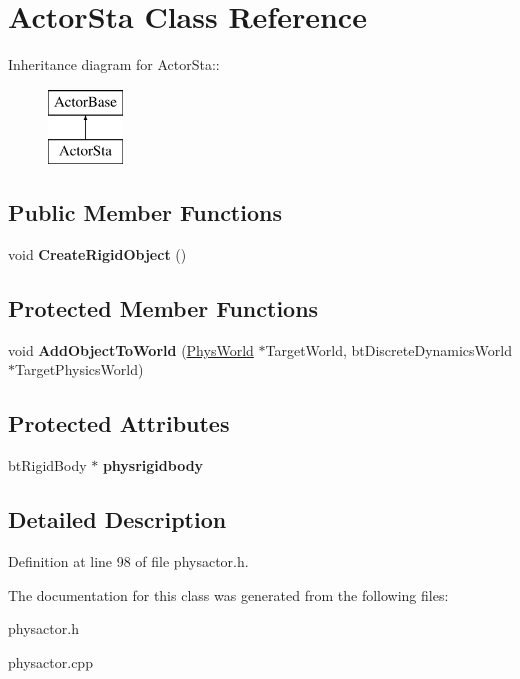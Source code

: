 \hypertarget{classActorSta}{
\section{ActorSta Class Reference}
\label{d3/daf/classActorSta}
}
Inheritance diagram for ActorSta::\begin{figure}[H]
\begin{center}
\leavevmode
\includegraphics[height=2cm]{d3/daf/classActorSta}
\end{center}
\end{figure}
\subsection*{Public Member Functions}
\begin{DoxyCompactItemize}
\item 
\hypertarget{classActorSta_ae856b69de748541606649d21d2e6c270}{
void {\bfseries CreateRigidObject} ()}
\label{d3/daf/classActorSta_ae856b69de748541606649d21d2e6c270}

\end{DoxyCompactItemize}
\subsection*{Protected Member Functions}
\begin{DoxyCompactItemize}
\item 
\hypertarget{classActorSta_a8d403fae36b366368982a4453d740a27}{
void {\bfseries AddObjectToWorld} (\hyperlink{classPhysWorld}{PhysWorld} $\ast$TargetWorld, btDiscreteDynamicsWorld $\ast$TargetPhysicsWorld)}
\label{d3/daf/classActorSta_a8d403fae36b366368982a4453d740a27}

\end{DoxyCompactItemize}
\subsection*{Protected Attributes}
\begin{DoxyCompactItemize}
\item 
\hypertarget{classActorSta_ad12363fc4cd60d6cdd5e3c6d36d96f20}{
btRigidBody $\ast$ {\bfseries physrigidbody}}
\label{d3/daf/classActorSta_ad12363fc4cd60d6cdd5e3c6d36d96f20}

\end{DoxyCompactItemize}


\subsection{Detailed Description}


Definition at line 98 of file physactor.h.

The documentation for this class was generated from the following files:\begin{DoxyCompactItemize}
\item 
physactor.h\item 
physactor.cpp\end{DoxyCompactItemize}
